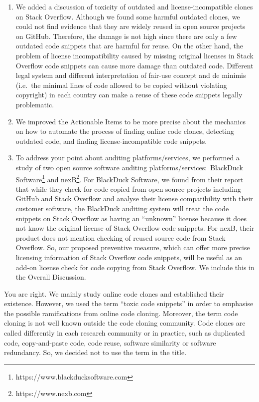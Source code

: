 \documentclass[a4paper,twoside,10pt]{reviewresponse}
\begin{document}
\begin{enumerate} \item We added a discussion of toxicity of outdated and
	license-incompatible clones on Stack Overflow. Although we found some harmful
	outdated clones, we could not find evidence that they are widely reused in open
	source projects on GitHub. Therefore, the damage is not high since there are only
	a few outdated code snippets that are harmful for reuse. On the other hand, the
	problem of license incompatibility caused by missing original licenses in Stack
	Overflow code snippets can cause more damage than outdated code. Different legal
	system and different interpretation of fair-use concept and de minimis (i.e.~the
	minimal lines of code allowed to be copied without violating copyright) in each
	country can make a reuse of these code snippets legally problematic.
	
	\item We improved the Actionable Items to be more precise about the mechanics
	on how to automate the process of finding online code clones, detecting
	outdated code, and finding license-incompatible code snippets.
	
	\item To address your point about auditing platforms/services, we performed a
	study of two open source software auditing platforms/services:~BlackDuck
	Software\footnote{https://www.blackducksoftware.com} and
	nexB\footnote{https://www.nexb.com}. For BlackDuck Software, we found from
	their report~\cite{CORSI2017} that while they check for code copied from open
	source projects including GitHub and Stack Overflow and analyse their license
	compatibility with their customer software, the BlackDuck auditing system will
	treat the code snippets on Stack Overflow as having an ``unknown'' license because
	it does not know the original license of Stack Overflow code snippets. For
	nexB, their product does not mention checking of reused source code from Stack
	Overflow. So, our proposed preventive measure, which can offer more precise
	licensing information of Stack Overflow code snippets, will be useful as an
	add-on license check for code copying from Stack Overflow. We include this in
	the Overall Discussion. \end{enumerate}


You are right. We mainly study online code clones and established their
existence. However, we used the term ``toxic code snippets'' in order to
emphasise the possible ramifications from online code cloning. Moreover, the
term code cloning is not well known outside the code cloning community. Code
clones are called differently in each research community or in practice, such as
duplicated code, copy-and-paste code, code reuse, software similarity or
software redundancy. So, we decided not to use the term in the title.
\end{document}
